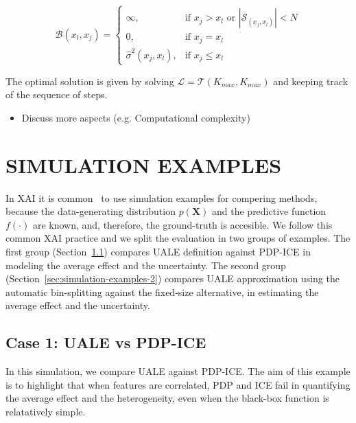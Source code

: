 \documentclass[twoside]{article}
\begin{document}
\begin{equation}
  \label{eq:cost_step}
  \mathcal{B}(x_l, x_j) = \begin{cases}
                            \infty, & \text{if $x_j > x_l$ or \(|\mathcal{S}_{(x_j, x_l)}| < N\)}\\
                            0, & \text{if $x_j = x_l$}\\
                            \hat{\sigma}^2(x_j, x_l), &\text{if $x_j \leq x_l$}
  \end{cases}
\end{equation}

The optimal solution is given by solving
\(\mathcal{L} = \mathcal{T}(K_{max}, K_{max})\) and keeping track of the sequence of
steps. 

\noindent

\begin{itemize}
\item Discuss more aspects (e.g. Computational complexity)
\end{itemize}

\section{SIMULATION EXAMPLES}
\label{sec:simulation-examples}

In XAI it is common~\citep{aas2021explaining, herbinger2022repid} to
use simulation examples for compering methods, because the
data-generating distribution \(p(\mathbf{X})\) and the predictive
function \(f(\cdot)\) are known, and, therefore, the ground-truth is
accesible. We follow this common XAI practice and we split the
evaluation in two groups of examples. The first group
(Section~\ref{sec:simulation-examples-1}) compares UALE definition
against PDP-ICE in modeling the average effect and the
uncertainty. The second group
(Section~\ref{sec:simulation-examples-2}) compares UALE approximation
using the automatic bin-splitting against the fixed-size alternative,
in estimating the average effect and the uncertainty. 

\subsection{Case 1: UALE vs PDP-ICE}
\label{sec:simulation-examples-1}

In this simulation, we compare UALE against PDP-ICE. The aim of this
example is to highlight that when features are correlated, PDP and ICE
fail in quantifying the average effect and the heterogeneity, even
when the black-box function is relatatively simple.
\end{document}

